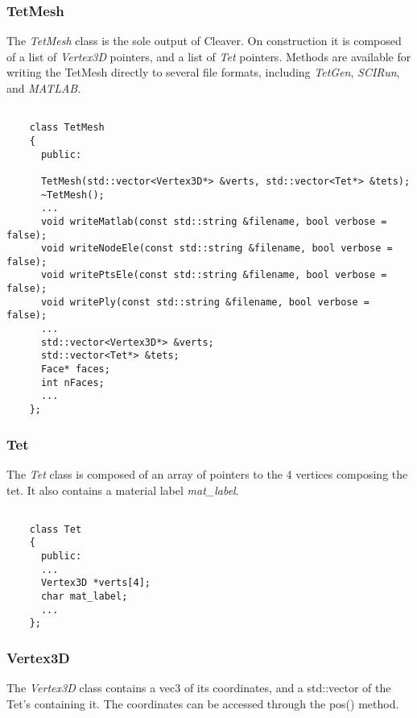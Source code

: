 \documentclass[fleqn,12pt,openany]{book}
\begin{document}
\subsubsection{TetMesh}

The \emph{TetMesh} class is the sole output of Cleaver. On 
construction it is composed of a list of \emph{Vertex3D} 
pointers, and a list of \emph{Tet} pointers. Methods are 
available for writing the TetMesh directly to several file
formats, including \emph{TetGen}, \emph{SCIRun}, and \emph{MATLAB}.

\begin{verbatim}

    class TetMesh
    {    
      public:

      TetMesh(std::vector<Vertex3D*> &verts, std::vector<Tet*> &tets);    
      ~TetMesh();
      ...
      void writeMatlab(const std::string &filename, bool verbose = false);
      void writeNodeEle(const std::string &filename, bool verbose = false);
      void writePtsEle(const std::string &filename, bool verbose = false);
      void writePly(const std::string &filename, bool verbose = false);
      ...
      std::vector<Vertex3D*> &verts;
      std::vector<Tet*> &tets;
      Face* faces;
      int nFaces;
      ...
    };
\end{verbatim}

\subsubsection{Tet}
The \emph{Tet} class is composed of an array of pointers to the 4 vertices 
composing the tet. It also contains a material label \emph{mat\_label}.


\begin{verbatim}

    class Tet
    {
      public:
      ...
      Vertex3D *verts[4];
      char mat_label;
      ...
    };
\end{verbatim}

\subsubsection{Vertex3D}
The \emph{Vertex3D} class contains a vec3 of its coordinates, and
a std::vector of the Tet's containing it. The coordinates can be
accessed through the pos() method. 
\end{document}
